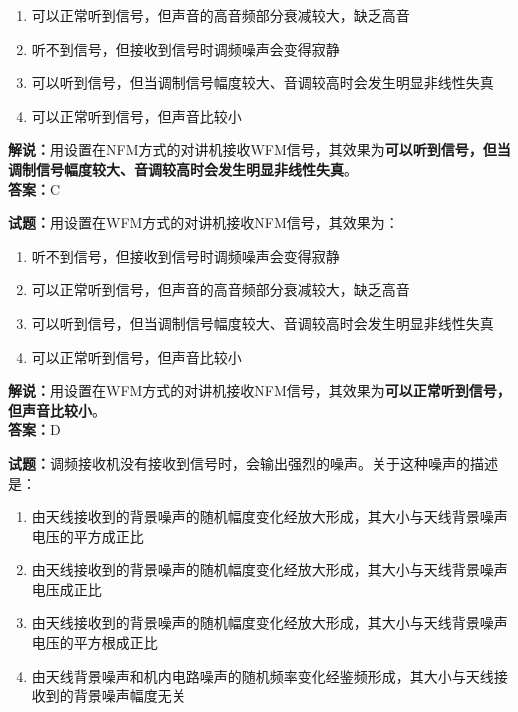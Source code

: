 \documentclass{ctexbook}
\begin{document}
\begin{enumerate}[leftmargin=3em]
	\item 可以正常听到信号，但声音的高音频部分衰减较大，缺乏高音
	\item 听不到信号，但接收到信号时调频噪声会变得寂静
	\item 可以听到信号，但当调制信号幅度较大、音调较高时会发生明显非线性失真
	\item 可以正常听到信号，但声音比较小
\end{enumerate}

\noindent\textbf{解说：}用设置在NFM方式的对讲机接收WFM信号，其效果为\textbf{可以听到信号，但当调制信号幅度较大、音调较高时会发生明显非线性失真}。\\\noindent\textbf{答案：}C


\bigskip


\noindent\textbf{试题：}用设置在WFM方式的对讲机接收NFM信号，其效果为：

\begin{enumerate}[leftmargin=3em]
	\item 听不到信号，但接收到信号时调频噪声会变得寂静
	\item 可以正常听到信号，但声音的高音频部分衰减较大，缺乏高音
	\item 可以听到信号，但当调制信号幅度较大、音调较高时会发生明显非线性失真
	\item 可以正常听到信号，但声音比较小
\end{enumerate}

\noindent\textbf{解说：}用设置在WFM方式的对讲机接收NFM信号，其效果为\textbf{可以正常听到信号，但声音比较小}。\\\noindent\textbf{答案：}D

\bigskip


\noindent\textbf{试题：}调频接收机没有接收到信号时，会输出强烈的噪声。关于这种噪声的描述是：

\begin{enumerate}[leftmargin=3em]
	\item 由天线接收到的背景噪声的随机幅度变化经放大形成，其大小与天线背景噪声电压的平方成正比
	\item 由天线接收到的背景噪声的随机幅度变化经放大形成，其大小与天线背景噪声电压成正比
	\item 由天线接收到的背景噪声的随机幅度变化经放大形成，其大小与天线背景噪声电压的平方根成正比
	\item 由天线背景噪声和机内电路噪声的随机频率变化经鉴频形成，其大小与天线接收到的背景噪声幅度无关
\end{enumerate}
\end{document}
